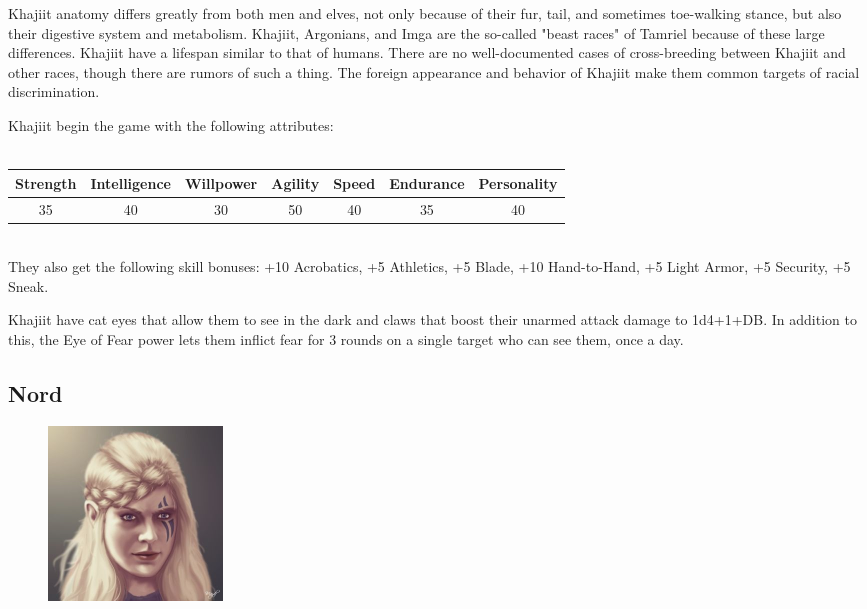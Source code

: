 \documentclass[12pt]{book}
\begin{document}
Khajiit anatomy differs greatly from both men and elves, not only because of their fur, tail, and sometimes toe-walking stance, but also their digestive system and metabolism. Khajiit, Argonians, and Imga are the so-called "beast races" of Tamriel because of these large differences. Khajiit have a lifespan similar to that of humans. There are no well-documented cases of cross-breeding between Khajiit and other races, though there are rumors of such a thing. The foreign appearance and behavior of Khajiit make them common targets of racial discrimination.

Khajiit begin the game with the following attributes:\\~\\
\begin{tabular}{|c|c|c|c|c|c|c|}
\hline
Strength & Intelligence & Willpower & Agility & Speed & Endurance & Personality\\ \hline
35 & 40 & 30 & 50 & 40 & 35 & 40\\ \hline

\end{tabular}\\

They also get the following skill bonuses: +10 Acrobatics, +5 Athletics, +5 Blade, +10 Hand-to-Hand, +5 Light Armor, +5 Security, +5 Sneak.

Khajiit have cat eyes that allow them to see in the dark and claws that boost their unarmed attack damage to 1d4+1+DB. In addition to this, the Eye of Fear power lets them inflict fear for 3 rounds on a single target who can see them, once a day.\\

\subsection{Nord}
\begin{figure}
	\includegraphics[width=\textwidth]{Nord.png}
\end{figure}
\end{document}
